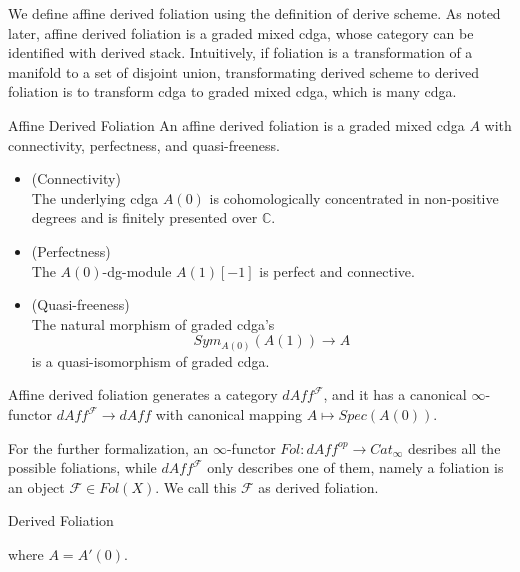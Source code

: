 \documentclass{article}
\begin{document}
\noindent
We define affine derived foliation using the definition of derive scheme. As noted later, affine derived foliation is a graded mixed cdga,
whose category can be identified with derived stack. Intuitively, if foliation is a transformation of a manifold to a set of disjoint union,  
transformating derived scheme to derived foliation is to transform cdga to graded mixed cdga, which is many cdga. \\
 

\begin{definition}{Affine Derived Foliation}{}
An affine derived foliation is a graded mixed cdga $A$ with connectivity, perfectness, and quasi-freeness.

\begin{itemize}
\item (Connectivity) \\
The underlying cdga $A(0)$ is cohomologically concentrated in non-positive degrees and is finitely presented over $\mathbb{C}$.
\item (Perfectness) \\
The $A(0)$-dg-module $A(1)[-1]$ is perfect and connective.
\item (Quasi-freeness) \\
The natural morphism of graded cdga's
\[Sym_{A(0)}(A(1)) \to A \]
is a quasi-isomorphism of graded cdga.
\end{itemize}

Affine derived foliation generates a category $dAff^{\mathcal{F}}$, and it has a canonical $\infty$-functor
$dAff^{\mathcal{F}} \to dAff$ with canonical mapping $A\mapsto Spec(A(0))$.
\end{definition}


\noindent
For the further formalization, an $\infty$-functor $Fol: dAff^{op}\to Cat_\infty$ desribes all the possible foliations,
while $dAff^{\mathcal{F}}$ only describes one of them, namely a foliation is an object $\mathcal{F} \in Fol(X)$.
We call this $\mathcal{F}$ as derived foliation. \\


\begin{definition}{Derived Foliation}{}
\vspace{1cm}
\vspace{1cm}

where $A= A'(0)$.
\end{definition}
\end{document}
